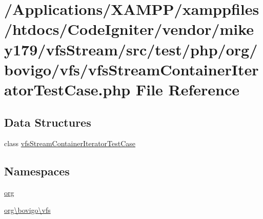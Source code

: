 \hypertarget{vfs_stream_container_iterator_test_case_8php}{}\section{/\+Applications/\+X\+A\+M\+P\+P/xamppfiles/htdocs/\+Code\+Igniter/vendor/mikey179/vfs\+Stream/src/test/php/org/bovigo/vfs/vfs\+Stream\+Container\+Iterator\+Test\+Case.php File Reference}
\label{vfs_stream_container_iterator_test_case_8php}
\subsection*{Data Structures}
\begin{DoxyCompactItemize}
\item 
class \mbox{\hyperlink{classorg_1_1bovigo_1_1vfs_1_1vfs_stream_container_iterator_test_case}{vfs\+Stream\+Container\+Iterator\+Test\+Case}}
\end{DoxyCompactItemize}
\subsection*{Namespaces}
\begin{DoxyCompactItemize}
\item 
 \mbox{\hyperlink{namespaceorg}{org}}
\item 
 \mbox{\hyperlink{namespaceorg_1_1bovigo_1_1vfs}{org\textbackslash{}bovigo\textbackslash{}vfs}}
\end{DoxyCompactItemize}
